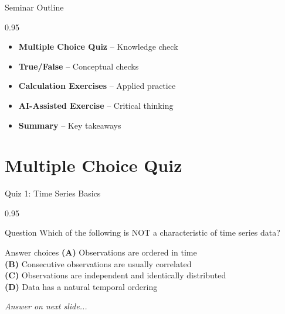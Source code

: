\documentclass[9pt, aspectratio=169, t]{beamer}
\subtitle{Seminar 0: Fundamentals}
\begin{document}
{
\begin{frame}
    \titlepage
\end{frame}
}


\begin{frame}{Seminar Outline}
    \begin{cminipage}{0.95\textwidth}
    \begin{itemize}
        \item \textbf{Multiple Choice Quiz} -- Knowledge check
        \vspace{0.15cm}
        \item \textbf{True/False} -- Conceptual checks
        \vspace{0.15cm}
        \item \textbf{Calculation Exercises} -- Applied practice
        \vspace{0.15cm}
        \item \textbf{AI-Assisted Exercise} -- Critical thinking
        \vspace{0.15cm}
        \item \textbf{Summary} -- Key takeaways
    \end{itemize}
    \end{cminipage}
\end{frame}

\section{Multiple Choice Quiz}

\begin{frame}{Quiz 1: Time Series Basics}
    \begin{cminipage}{0.95\textwidth}
    \begin{alertblock}{Question}
        Which of the following is NOT a characteristic of time series data?
    \end{alertblock}

    \vspace{0.4cm}

    \begin{block}{Answer choices}
        \textcolor{MainBlue}{\textbf{(A)}} Observations are ordered in time\\[3pt]
        \textcolor{MainBlue}{\textbf{(B)}} Consecutive observations are usually correlated\\[3pt]
        \textcolor{MainBlue}{\textbf{(C)}} Observations are independent and identically distributed\\[3pt]
        \textcolor{MainBlue}{\textbf{(D)}} Data has a natural temporal ordering
    \end{block}

    \vspace{0.5cm}

    \begin{center}
        \textit{Answer on next slide...}
    \end{center}
    \end{cminipage}
\end{frame}
\end{document}
